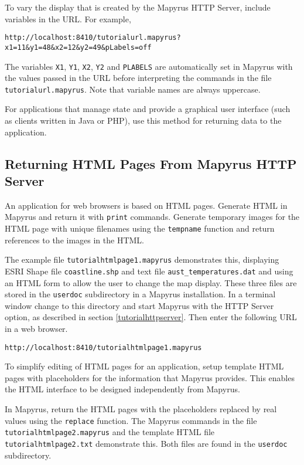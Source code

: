 To vary the display that is created by the Mapyrus HTTP Server, include
variables in the URL.  For example,

\begin{verbatim}
http://localhost:8410/tutorialurl.mapyrus?x1=11&y1=48&x2=12&y2=49&pLabels=off
\end{verbatim}

The variables \texttt{X1}, \texttt{Y1}, \texttt{X2}, \texttt{Y2}
and \texttt{PLABELS} are automatically set in Mapyrus with the values
passed in the URL before interpreting
the commands in the file \texttt{tutorialurl.mapyrus}.
Note that variable names are always uppercase.

For applications that manage state
and provide a graphical user interface (such as clients written in
Java or PHP), use this method for returning data to the
application.

\subsection{Returning HTML Pages From Mapyrus HTTP Server}

An application for web browsers is based on HTML pages.
Generate HTML in Mapyrus and return it with \texttt{print} commands.
Generate temporary images for the HTML page with
unique filenames using the
\texttt{tempname}
function and return references to the images in the HTML.

The example file \texttt{tutorialhtmlpage1.mapyrus} demonstrates
this, displaying ESRI Shape file
\texttt{coastline.shp}
and text file
\texttt{aust\_temperatures.dat}
and using an HTML form to allow
the user to change the map display.
These three files are stored in the \texttt{userdoc} subdirectory
in a Mapyrus installation.
In a terminal window change to this directory and
start Mapyrus with the HTTP Server option, as described in section
\ref{tutorialhttpserver}.
Then enter the following URL in a web browser.

\begin{verbatim}
http://localhost:8410/tutorialhtmlpage1.mapyrus
\end{verbatim}

To simplify editing of HTML pages for an application, setup
template HTML pages with placeholders for the information that
Mapyrus provides.  This enables the HTML interface to be designed
independently from Mapyrus.

In Mapyrus, return the HTML pages with the placeholders
replaced by real values using the
\texttt{replace}
function.  The Mapyrus commands in the file \texttt{tutorialhtmlpage2.mapyrus}
and the template HTML file \texttt{tutorialhtmlpage2.txt}
demonstrate this.  Both files are found in the
\texttt{userdoc} subdirectory.

